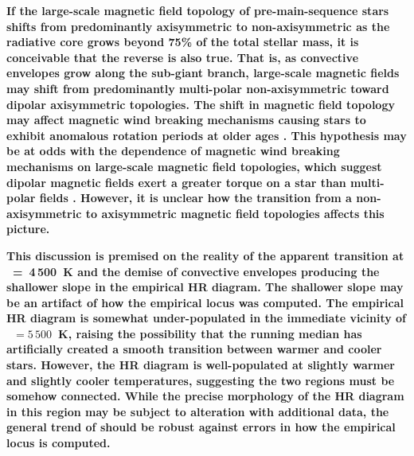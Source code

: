 \documentclass{aa}
\begin{document}
{\bf If the large-scale magnetic field topology of pre-main-sequence stars shifts from predominantly axisymmetric to non-axisymmetric as the radiative core grows beyond 75\% of the total stellar mass, it is conceivable that the reverse is also true. That is, as convective envelopes grow along the sub-giant branch, large-scale magnetic fields may shift from predominantly multi-polar non-axisymmetric toward dipolar axisymmetric topologies. The shift in magnetic field topology may affect magnetic wind breaking mechanisms causing stars to exhibit anomalous rotation periods at older ages \citep{vanSaders2016}. This hypothesis may be at odds with the dependence of magnetic wind breaking mechanisms on large-scale magnetic field topologies, which suggest dipolar magnetic fields exert a greater torque on a star than multi-polar fields \citep[e.g.,][]{Reville2015}. However, it is unclear how the transition from a non-axisymmetric to axisymmetric magnetic field topologies affects this picture.}

{\bf This discussion is premised on the reality of the apparent transition at \teff~=~4\,500~K and the demise of convective envelopes producing the shallower slope in the empirical HR diagram. The shallower slope may be an artifact of how the empirical locus was computed. The empirical HR diagram is somewhat under-populated in the immediate vicinity of \teff~$= 5\,500$~K, raising the possibility that the running median has artificially created a smooth transition between warmer and cooler stars. However, the HR diagram is well-populated at slightly warmer and slightly cooler temperatures, suggesting the two regions must be somehow connected. While the precise morphology of the HR diagram in this region may be subject to alteration with additional data, the general trend of should be robust against errors in how the empirical locus is computed.}
\end{document}
